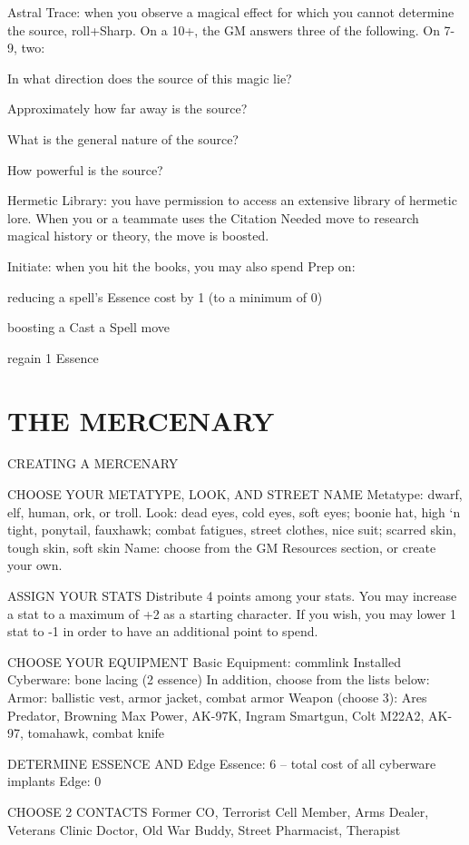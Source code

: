 Astral Trace: when you observe a magical effect for which you cannot determine the source, roll+Sharp. On a 10+, the GM answers three of the following. On 7-9, two:

In what direction does the source of this magic lie?

Approximately how far away is the source?

What is the general nature of the source?

How powerful is the source?

Hermetic Library: you have permission to access an extensive library of hermetic lore. When you or a teammate uses the Citation Needed move to research magical history or theory, the move is boosted.

Initiate: when you hit the books, you may also spend Prep on:

reducing a spell’s Essence cost by 1 (to a minimum of 0)

boosting a Cast a Spell move

regain 1 Essence



\clearpage
\section{THE MERCENARY}
CREATING A MERCENARY

CHOOSE YOUR METATYPE, LOOK, AND STREET NAME
Metatype: dwarf, elf, human, ork, or troll.
Look: dead eyes, cold eyes, soft eyes; boonie hat, high ‘n tight, ponytail, fauxhawk; combat fatigues, street clothes, nice suit; scarred skin, tough skin, soft skin
Name: choose from the GM Resources section, or create your own.

ASSIGN YOUR STATS
Distribute 4 points among your stats. You may increase a stat to a maximum of +2 as a starting character. If you wish, you may lower 1 stat to -1 in order to have an additional point to spend.

CHOOSE YOUR EQUIPMENT
Basic Equipment: commlink
Installed Cyberware: bone lacing (2 essence)
In addition, choose from the lists below:
Armor: ballistic vest, armor jacket, combat armor
Weapon (choose 3): Ares Predator, Browning Max Power, AK-97K, Ingram Smartgun, Colt M22A2, AK-97, tomahawk, combat knife

DETERMINE ESSENCE AND Edge
Essence: 6 – total cost of all cyberware implants Edge: 0

CHOOSE 2 CONTACTS
Former CO, Terrorist Cell Member, Arms Dealer, Veterans Clinic Doctor, Old War Buddy, Street Pharmacist, Therapist

